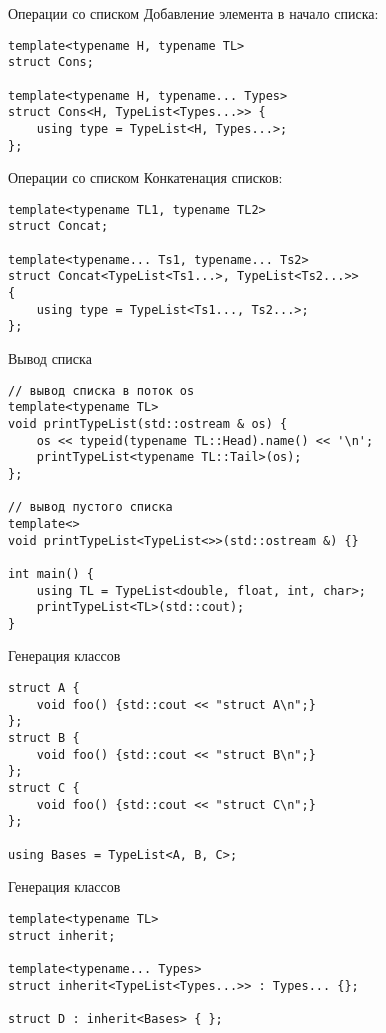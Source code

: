 \documentclass{beamer}
\begin{document}
\begin{frame}[fragile]{Операции со списком}
    Добавление элемента в начало списка:
\begin{lstlisting}
template<typename H, typename TL>
struct Cons;

template<typename H, typename... Types>
struct Cons<H, TypeList<Types...>> {
    using type = TypeList<H, Types...>;
};
\end{lstlisting}
\end{frame}

\begin{frame}[fragile]{Операции со списком}
    Конкатенация списков:
\begin{lstlisting}
template<typename TL1, typename TL2>
struct Concat;

template<typename... Ts1, typename... Ts2>
struct Concat<TypeList<Ts1...>, TypeList<Ts2...>>
{
    using type = TypeList<Ts1..., Ts2...>;
};
\end{lstlisting}
\end{frame}

\begin{frame}[fragile]{Вывод списка}
\begin{lstlisting}
// вывод списка в поток os
template<typename TL>
void printTypeList(std::ostream & os) {
    os << typeid(typename TL::Head).name() << '\n';
    printTypeList<typename TL::Tail>(os);
};

// вывод пустого списка
template<>
void printTypeList<TypeList<>>(std::ostream &) {}

int main() {
    using TL = TypeList<double, float, int, char>;
    printTypeList<TL>(std::cout);
}
\end{lstlisting}
\end{frame}

\begin{frame}[fragile]{Генерация классов}
\begin{lstlisting}
struct A { 
    void foo() {std::cout << "struct A\n";} 
};
struct B { 
    void foo() {std::cout << "struct B\n";} 
};
struct C { 
    void foo() {std::cout << "struct C\n";} 
};

using Bases = TypeList<A, B, C>;
\end{lstlisting}
\end{frame}

\begin{frame}[fragile]{Генерация классов}
\begin{lstlisting}
template<typename TL>
struct inherit;

template<typename... Types>
struct inherit<TypeList<Types...>> : Types... {};

struct D : inherit<Bases> { };
\end{lstlisting}
\end{frame}
\end{document}
